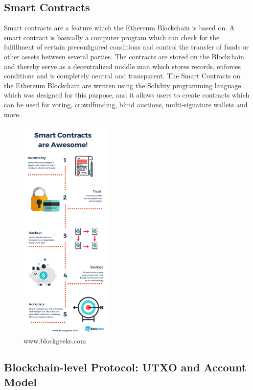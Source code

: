 \subsection{Smart Contracts}

Smart contracts are a feature which the Ethereum Blockchain is based on. A smart contract is basically a computer program which can check for the fulfillment of certain preconfigured conditions and control the transfer of funds or other assets between several parties. The contracts are stored on the Blockchain and thereby serve as a decentralized middle man which stores records, enforces conditions and is completely neutral and transparent.
The Smart Contracts on the Ethereum Blockchain are written using the Solidity programming language which was designed for this purpose, and it allows users to create contracts which can be used for voting, crowdfunding, blind auctions, multi-signature wallets and more.

\begin{figure}[h]
\centering
\includegraphics[width=0.4\textwidth]{images/smartcontracts.png}
\caption{\label{fig:Smartcontracts}www.blockgeeks.com}
\end{figure}




\subsection{Blockchain-level Protocol: UTXO and Account Model}

